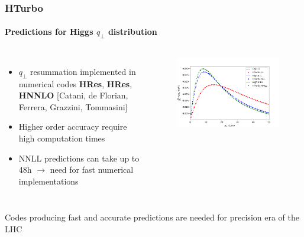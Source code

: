\documentclass[aspectratio=43]{beamer}
\begin{document}
\begin{frame}

	\frametitle{HTurbo}
	\framesubtitle{Predictions for Higgs $q_{\perp}$ distribution}
	
	\footnotesize
	
	\begin{columns}
		
			
		\begin{itemize}
			\item $q_{\perp}$ resummation implemented in numerical codes \textbf{HRes}, \textbf{HRes}, \textbf{HNNLO} {\color{blue}[Catani, de Florian, Ferrera, Grazzini, Tommasini]} 
			\item Higher order accuracy require \\
			{\color{red}high computation times}
			\item NNLL predictions can take up to 48h $\longrightarrow$ need for {\color{red} fast numerical implementations}
		\end{itemize}

	
		\begin{figure}
			\includegraphics[width = 6 cm]{plots/part3/chapter6/higgs_qt_all.png}
		\end{figure}		
			
	\end{columns}

	\vspace{0.5 cm}
	
	Codes producing fast and accurate predictions are needed for precision era of the LHC
	
\end{frame}
\end{document}
